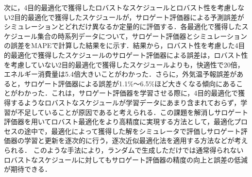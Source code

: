 次に，4目的最適化で獲得したロバストなスケジュールとロバスト性を考慮しない2目的最適化で獲得したスケジュールが，サロゲート評価器による予測誤差がシミュレーションとどれだけ異なるか定量的に評価する．各最適化で獲得したスケジュール集合の時系列データについて，サロゲート評価器とシミュレーションの誤差をMAPEで計算した結果をに示す．結果から，ロバスト性を考慮した4目的最適化で獲得したスケジュールのサロゲート評価器による誤差は，ロバスト性を考慮していない2目的最適化で獲得したスケジュールよりも，快適性で20倍，エネルギー消費量は5.4倍大きいことがわかった．さらに，外気温予報誤差があると，サロゲート評価器による誤差が1.1\%～6.5\%ほど大きくなる傾向にあることがわかった．これは，サロゲート評価器を学習させる際に，4目的最適化で獲得するようなロバストなスケジュールが学習データにあまり含まれておらず，学習が不足していることが原因であると考えられる．この課題を解消しサロゲート評価器を用いてロバスト最適化をより高精度に実現する方法として，最適化プロセスの途中で，最適化によって獲得した解をシミュレータで評価しサロゲート評価器の学習と更新を逐次的に行う，逐次近似最適化法を適用する方法などが考えられる．
このような手法により，ランダムで生成しただけでは通常得られないロバストなスケジュールに対してもサロゲート評価器の精度の向上と誤差の低減が期待できる．

